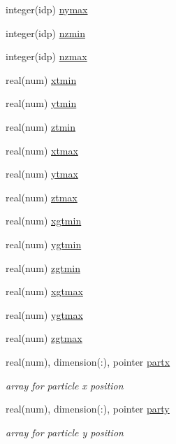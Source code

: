 \begin{DoxyCompactItemize}
\item 
integer(idp) \hyperlink{namespacepython__pointers_a02ace0f573d69c7a02c31b96704a81bf}{nymax}
\item 
integer(idp) \hyperlink{namespacepython__pointers_a6de008bd6827979eb76463e5da2f857e}{nzmin}
\item 
integer(idp) \hyperlink{namespacepython__pointers_a9121a35b32fac876b7a6998f6d800fab}{nzmax}
\item 
real(num) \hyperlink{namespacepython__pointers_a69aa08a8bf01ef8d66b81af67f750a9d}{xtmin}
\item 
real(num) \hyperlink{namespacepython__pointers_ad4774639ad0f7fe1b23fea26a713fe6b}{ytmin}
\item 
real(num) \hyperlink{namespacepython__pointers_a470d148a146f86953442dca5976e24f7}{ztmin}
\item 
real(num) \hyperlink{namespacepython__pointers_a56c274f81ac2851fba9fe7397de6fc1b}{xtmax}
\item 
real(num) \hyperlink{namespacepython__pointers_a478abc5845abd884152862914f9bca98}{ytmax}
\item 
real(num) \hyperlink{namespacepython__pointers_a6feb09553974412979ed666ae061a1cb}{ztmax}
\item 
real(num) \hyperlink{namespacepython__pointers_a266c35c60dfb7d7891fc0b15d3484f16}{xgtmin}
\item 
real(num) \hyperlink{namespacepython__pointers_a131c8981c4a0437d422682375f4acfab}{ygtmin}
\item 
real(num) \hyperlink{namespacepython__pointers_ac782e4d3b6e67b7391a8c6f03617f937}{zgtmin}
\item 
real(num) \hyperlink{namespacepython__pointers_ae4ae1714533add4e893ccdb25fb89854}{xgtmax}
\item 
real(num) \hyperlink{namespacepython__pointers_a38ecc0e758a6b67f7aecb055e03927a1}{ygtmax}
\item 
real(num) \hyperlink{namespacepython__pointers_a46b682b61a01fee0e8b0c9aa64e9a59b}{zgtmax}
\item 
real(num), dimension(\+:), pointer \hyperlink{namespacepython__pointers_a11c207d7f4fb2d96dad5a926172277df}{partx}
\begin{DoxyCompactList}\small\item\em array for particle x position \end{DoxyCompactList}\item 
real(num), dimension(\+:), pointer \hyperlink{namespacepython__pointers_a7ed293531cd47aefba8bd76e2692c30d}{party}
\begin{DoxyCompactList}\small\item\em array for particle y position \end{DoxyCompactList}\item 

\end{DoxyCompactItemize}
